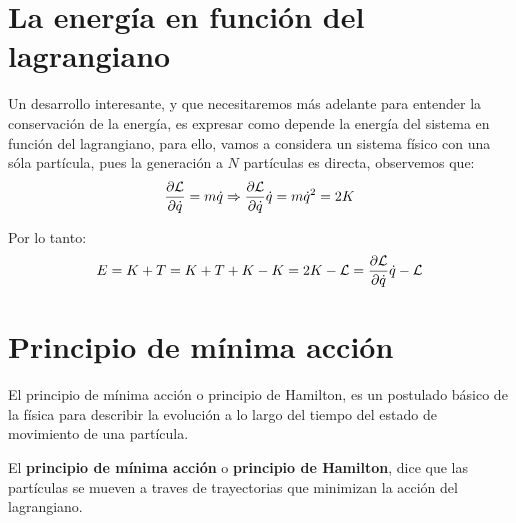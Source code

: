 \section{La energía en función del lagrangiano}\label{sec:la-energia-en-funcion-del-lagrangiano}

Un desarrollo interesante, y que necesitaremos más adelante para entender la conservación de la energía, es expresar como depende la energía del sistema en función del lagrangiano, para ello, vamos a considera un sistema físico con una sóla partícula, pues la generación a $N$ partículas es directa, observemos que:
\begin{equation*}
	\frac{\partial\mathcal{L}}{\partial\dot{q}} =m\dot{q}\Rightarrow \frac{\partial\mathcal{L}}{\partial\dot{q}}\dot{q} =m\dot{q}^2 = 2K
\end{equation*}

Por lo tanto:
\begin{equation}
	\label{eq:energia-lagrangiana}
	E=K+T=K+T+K-K=2K-\mathcal{L}=\frac{\partial\mathcal{L}}{\partial\dot{q}}\dot{q}-\mathcal{L}
\end{equation}

\section{Principio de mínima acción}\label{sec:principio-de-minima-accion}

El principio de mínima acción o principio de Hamilton, es un postulado básico de la física para describir la evolución a lo largo del tiempo del estado de movimiento de una partícula.

El \textbf{principio de mínima acción} o \textbf{principio de Hamilton}, dice que las partículas se mueven a traves de trayectorias que minimizan la acción del lagrangiano.
